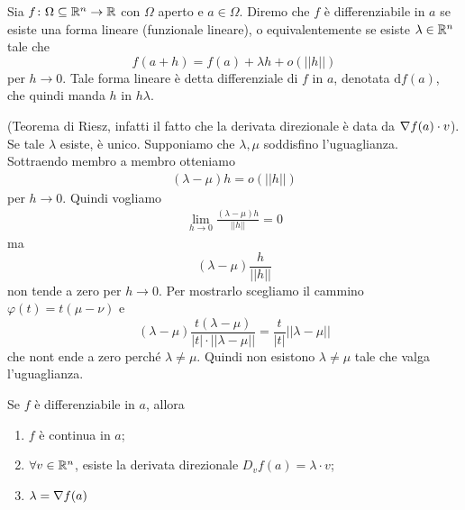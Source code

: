 \documentclass[a4paper]{article}
\begin{document}
\begin{radioactive}
\begin{snippetdefinition}{}
    Sia \(f \colon \Omega \subseteq \mathbb{R}^n \to \mathbb{R}\)
    con \(\Omega\) aperto e \(a \in \Omega\).
    Diremo che \(f\) è differenziabile in \(a\)
    se esiste una forma lineare (funzionale lineare),
    o equivalentemente se esiste \(\lambda \in \mathbb{R}^n\) tale che
    \[
        f(a + h) = f(a) + \lambda h + o(||h||)
    \]
    per \(h \to 0\).
    Tale forma lineare è detta differenziale di \(f\) in \(a\),
    denotata \(\text{d}f(a)\), che quindi manda \(h\) in \(h\lambda\).
\end{snippetdefinition}

(Teorema di Riesz, infatti il fatto che la derivata direzionale è data da \(\nabla f(a) \cdot v\)).
Se tale \(\lambda\) esiste, è unico.
Supponiamo che \(\lambda,\mu\) soddisfino l'uguaglianza.
Sottraendo membro a membro otteniamo
\begin{align*}
    (\lambda - \mu) h = o(||h||)
\end{align*}
per \(h\to 0\).
Quindi vogliamo
\begin{align*}
    \lim_{h\to 0} \frac{(\lambda - \mu)h}{||h||} = 0
\end{align*}
ma 
\[
    (\lambda - \mu) \frac{h}{||h||}
\]
non tende a zero per \(h\to 0\).
Per mostrarlo scegliamo il cammino \(\varphi(t) = t(\mu-\nu)\) e
\[
    (\lambda - \mu) \frac{t(\lambda - \mu)}{|t| \cdot ||\lambda - \mu||}
    = \frac{t}{|t|}||\lambda - \mu||
\]
che nont ende a zero perché \(\lambda \neq \mu\).
Quindi non esistono \(\lambda \neq \mu\) tale che valga l'uguaglianza.

\begin{snippettheorem}{}
    Se \(f\) è differenziabile in \(a\), allora
    \begin{enumerate}
        \item \(f\) è continua in \(a\);
        \item \(\forall v \in \mathbb{R}^n\), esiste la derivata direzionale
        \(D_v f(a) = \lambda \cdot v\);
        \item \(\lambda = \nabla f(a)\)
    \end{enumerate}
\end{snippettheorem}
\end{radioactive}
\end{document}
